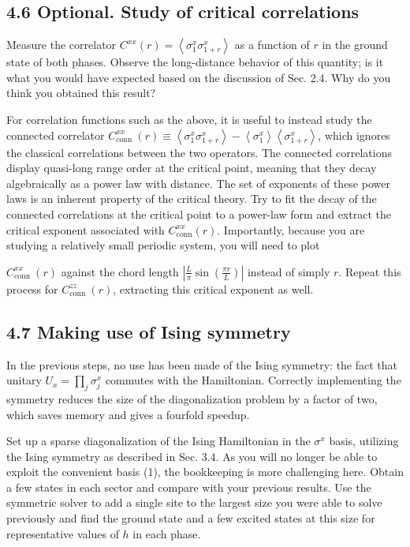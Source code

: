 \documentclass[10pt]{article}
\begin{document}
\subsection*{4.6 Optional. Study of critical correlations}
Measure the correlator $C^{x x}(r)=\left\langle\sigma_{1}^{x} \sigma_{1+r}^{x}\right\rangle$ as a function of $r$ in the ground state of both phases. Observe the long-distance behavior of this quantity; is it what you would have expected based on the discussion of Sec. 2.4. Why do you think you obtained this result?

For correlation functions such as the above, it is useful to instead study the connected correlator $C_{\text {conn }}^{x x}(r) \equiv\left\langle\sigma_{1}^{x} \sigma_{1+r}^{x}\right\rangle-\left\langle\sigma_{1}^{x}\right\rangle\left\langle\sigma_{1+r}^{x}\right\rangle$, which ignores the classical correlations between the two operators. The connected correlations display quasi-long range order at the critical point, meaning that they decay algebraically as a power law with distance. The set of exponents of these power laws is an inherent property of the critical theory. Try to fit the decay of the connected correlations at the critical point to a power-law form and extract the critical exponent associated with $C_{\operatorname{conn}}^{x x}(r)$. Importantly, because you are studying a relatively small periodic system, you will need to plot

$C_{\text {conn }}^{x x}(r)$ against the chord length $\left|\frac{L}{\pi} \sin \left(\frac{\pi r}{L}\right)\right|$ instead of simply $r$. Repeat this process for $C_{\text {conn }}^{z z}(r)$, extracting this critical exponent as well.

\subsection*{4.7 Making use of Ising symmetry}
In the previous steps, no use has been made of the Ising symmetry: the fact that unitary $U_{x}=\prod_{j} \sigma_{j}^{x}$ commutes with the Hamiltonian. Correctly implementing the symmetry reduces the size of the diagonalization problem by a factor of two, which saves memory and gives a fourfold speedup.

Set up a sparse diagonalization of the Ising Hamiltonian in the $\sigma^{x}$ basis, utilizing the Ising symmetry as described in Sec. 3.4. As you will no longer be able to exploit the convenient basis (1), the bookkeeping is more challenging here. Obtain a few states in each sector and compare with your previous results. Use the symmetric solver to add a single site to the largest size you were able to solve previously and find the ground state and a few excited states at this size for representative values of $h$ in each phase.
\end{document}
